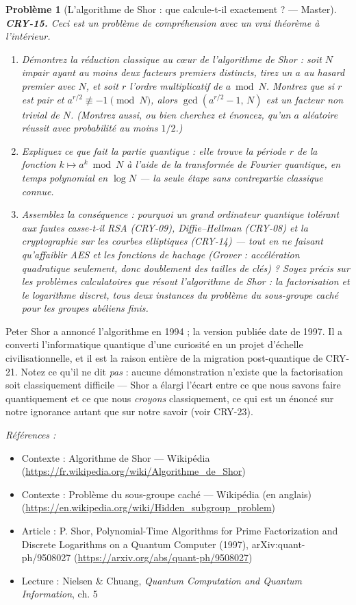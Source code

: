 \documentclass[11pt]{article}
\newtheorem{problem}{Problème}
\newenvironment{refs}{\par\small\noindent\emph{Références :}\begin{itemize}\setlength\itemsep{0pt}}{\end{itemize}\normalsize}
\begin{document}
\begin{problem}[{L'algorithme de Shor : que calcule-t-il exactement ? --- Master}]
\textbf{CRY-15.} Ceci est un problème de compréhension avec un vrai
théorème à l'intérieur.
\begin{enumerate}
\item[(a)] Démontrez la réduction classique au c\oe{}ur de l'algorithme de Shor :
soit $N$ impair ayant au moins deux facteurs premiers distincts, tirez un $a$ au hasard
premier avec $N$, et soit $r$ l'ordre multiplicatif de $a \bmod N$. Montrez
que si $r$ est pair et $a^{r/2} \not\equiv -1 \pmod N$, alors
$\gcd(a^{r/2} - 1,\, N)$ est un facteur non trivial de $N$. (Montrez aussi, ou bien
cherchez et énoncez, qu'un $a$ aléatoire réussit avec probabilité au moins $1/2$.)
\item[(b)] Expliquez ce que fait la partie quantique : elle trouve la période $r$ de la fonction
$k \mapsto a^k \bmod N$ à l'aide de la transformée de Fourier quantique, en temps polynomial
en $\log N$ --- la seule étape sans contrepartie classique connue.
\item[(c)] Assemblez la
conséquence : pourquoi un grand ordinateur quantique tolérant aux fautes casse-t-il RSA
(CRY-09), Diffie--Hellman (CRY-08) et la cryptographie sur les courbes elliptiques (CRY-14) ---
tout en ne faisant qu'affaiblir AES et les fonctions de hachage (Grover : accélération
quadratique seulement, donc doublement des tailles de clés) ? Soyez précis sur les problèmes
calculatoires que résout l'algorithme de Shor : la factorisation et le logarithme discret,
tous deux instances du problème du sous-groupe caché pour les groupes abéliens finis.
\end{enumerate}

\end{problem}

\noindent Peter Shor a annoncé l'algorithme en 1994 ; la version publiée date de
1997. Il a converti l'informatique quantique d'une curiosité en un projet d'échelle
civilisationnelle, et il est la raison entière de la migration post-quantique de CRY-21.
Notez ce qu'il ne dit \textit{pas} : aucune démonstration n'existe que la factorisation soit
classiquement difficile --- Shor a élargi l'écart entre ce que nous savons faire
quantiquement et ce que nous \textit{croyons} classiquement, ce qui est un énoncé sur notre
ignorance autant que sur notre savoir (voir CRY-23).

\begin{refs}
\item Contexte : Algorithme de Shor --- Wikipédia (\url{https://fr.wikipedia.org/wiki/Algorithme_de_Shor})
\item Contexte : Problème du sous-groupe caché --- Wikipédia (en anglais) (\url{https://en.wikipedia.org/wiki/Hidden_subgroup_problem})
\item Article : P. Shor, \og{} Polynomial-Time Algorithms for Prime Factorization and Discrete Logarithms on a Quantum Computer \fg{} (1997), arXiv:quant-ph/9508027 (\url{https://arxiv.org/abs/quant-ph/9508027})
\item Lecture : Nielsen \& Chuang, \textit{Quantum Computation and Quantum Information}, ch. 5
\end{refs}
\end{document}
